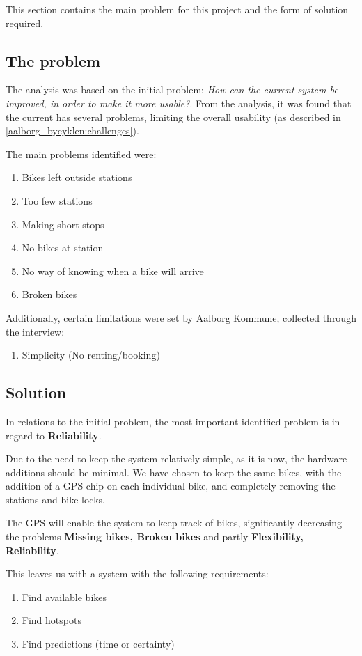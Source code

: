 This section contains the main problem for this project and the form of solution required.

\subsection{The problem}
The analysis was based on the initial problem: \textit{How can the current \citybike system be improved, in order to make it more usable?}.
From the analysis, it was found that the current \citybike has several problems, limiting the overall usability (as described in \cref{aalborg_bycyklen:challenges}).

The main problems identified were:
\begin{enumerate}
\item Bikes left outside stations
\item Too few stations
\item Making short stops
\item No bikes at station
\item No way of knowing when a bike will arrive
\item Broken bikes
\end{enumerate}

Additionally, certain limitations were set by Aalborg Kommune, collected through the interview:

\begin{enumerate}
\item Simplicity (No renting/booking)
\end{enumerate}

\subsection{Solution}
In relations to the initial problem, the most important identified problem is in regard to \textbf{Reliability}.

Due to the need to keep the system relatively simple, as it is now, the hardware additions should be minimal.
We have chosen to keep the same bikes, with the addition of a GPS chip on each individual bike, and completely removing the stations and bike locks.

The GPS will enable the system to keep track of bikes, significantly decreasing the problems \textbf{Missing bikes, Broken bikes} and partly \textbf{Flexibility, Reliability}.

This leaves us with a system with the following requirements:
\begin{enumerate}
\item Find available bikes
\item Find hotspots
\item Find predictions (time or certainty)
\end{enumerate}


